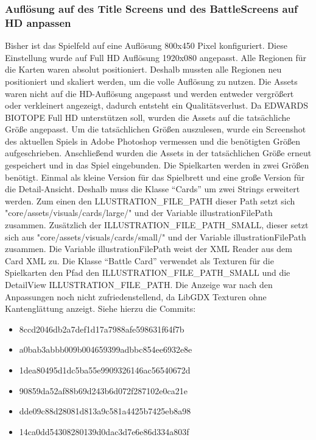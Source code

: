 \subsubsection{Auflösung auf des Title Screens und des BattleScreens auf HD anpassen}
Bisher ist das Spielfeld auf eine Auflösung 800x450 Pixel konfiguriert. Diese Einstellung wurde auf Full HD Auflösung 1920x080 angepasst. Alle Regionen für die Karten waren absolut positioniert. Deshalb mussten alle Regionen neu positioniert und skaliert werden, um die volle Auflösung zu nutzen. 
Die Assets waren nicht auf die HD-Auflösung angepasst und werden entweder vergrößert oder verkleinert angezeigt, dadurch entsteht ein Qualitätsverlust. Da EDWARDS BIOTOPE Full HD unterstützen soll, wurden die Assets auf die tatsächliche Größe angepasst. Um die tatsächlichen Größen auszulesen, wurde ein Screenshot des aktuellen Spiels in Adobe Photoshop vermessen und die benötigten Größen aufgeschrieben. Anschließend wurden die Assets in der tatsächlichen Größe erneut gespeichert und in das Spiel eingebunden. Die Spielkarten werden in zwei Größen benötigt. Einmal als kleine Version für das Spielbrett und eine große Version für die Detail-Ansicht. Deshalb muss die Klasse “Cards” um zwei Strings erweitert werden. Zum einen den LLUSTRATION\_FILE\_PATH dieser Path setzt sich "core/assets/visuals/cards/large/" und der Variable illustrationFilePath zusammen. Zusätzlich der ILLUSTRATION\_FILE\_PATH\_SMALL, dieser setzt sich aus "core/assets/visuals/cards/small/" und der Variable illustrationFilePath zusammen. Die Variable illustrationFilePath weist der XML Reader aus dem Card XML zu. Die Klasse “Battle Card” verwendet als Texturen für die Spielkarten den Pfad den ILLUSTRATION\_FILE\_PATH\_SMALL und die DetailView ILLUSTRATION\_FILE\_PATH. 
Die Anzeige war nach den Anpassungen noch nicht zufriedenstellend, da LibGDX Texturen ohne Kantenglättung anzeigt.
Siehe hierzu die Commits:
\begin{itemize}
\item 8ccd2046db2a7def1d17a7988afe598631f64f7b
\item a0bab3abbb009b004659399adbbc854ee6932e8e
\item 1dea80495d1dc5ba55e9909326146ac56540672d
\item 90859da52af88b69d243b6d072f287102e0ca21e
\item dde09c88d28081d813a9c581a4425b7425eb8a98
\item 14ca0dd54308280139d0dac3d7e6e86d334a803f
\end{itemize}

